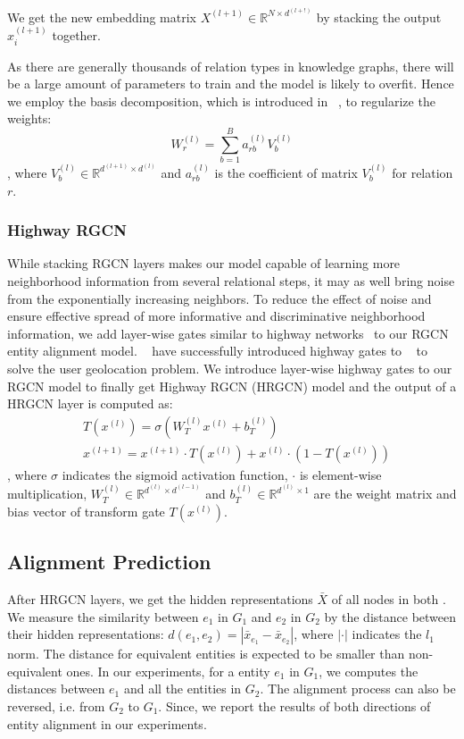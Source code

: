 	We get the new embedding matrix $X^{(l+1)} \in \mathbb{R}^{N \times d^{(l+!)}}$ by stacking the output $x_i^{(l+1)}$ together.
	
	As there are generally thousands of relation types in knowledge graphs, there will be a large amount of parameters to train and the model is likely to overfit. Hence we employ the basis decomposition, which is introduced in ~\cite{Schlichtkrull2017Modeling}, to regularize the weights:
	\begin{equation}
	W_r^{(l)}=\sum\limits_{b=1}^B a_{rb}^{(l)}V_b^{(l)}
	\end{equation}
	, where $V_b^{(l)} \in \mathbb{R}^{d^{(l+1)} \times d^{(l)}}$ and $a_{rb}^{(l)}$ is the coefficient of matrix $V_b^{(l)}$ for relation $r$.
	
	
	\subsubsection{Highway RGCN}
	\label{section:hgcn}
	While stacking RGCN layers makes our model capable of learning more neighborhood information from several relational steps, it may as well bring noise from the exponentially increasing neighbors. To reduce the effect of noise and ensure effective spread of more informative and discriminative neighborhood information, we add layer-wise gates similar to highway networks~\cite{Srivastava2015Highway} to our RGCN entity alignment model. ~\cite{Rahimi2018Semi} have successfully introduced highway gates to \GCNs~\cite{Kipf2016Semi} to solve the user geolocation problem. We introduce layer-wise highway gates to our RGCN model to finally get Highway RGCN (HRGCN) model and the output of a HRGCN layer is computed as:
	\begin{equation}
	\begin{split}
	&T(x^{(l)})=\sigma(W_T^{(l)}x^{(l)}+b_T^{(l)}) \\
	&x^{(l+1)}=x^{(l+1)} \cdot T(x^{(l)})+x^{(l)} \cdot (1-T(x^{(l)}))
	\end{split}
	\end{equation}
	, where $\sigma$ indicates the sigmoid activation function, $\cdot$ is element-wise multiplication, $W_T^{(l)} \in \mathbb{R}^{d^{(l)} \times d^{(l-1)}}$ and $b_T^{(l)} \in \mathbb{R}^{d^{(l)} \times 1}$ are the weight matrix and bias vector of transform gate $T(x^{(l)})$.
	
	\subsection{Alignment Prediction}
	After HRGCN layers, we get the hidden representations $\bar{X}$ of all nodes in both \KGs. We measure the similarity between $e_1$ in $G_1$ and $e_2$ in $G_2$ by the distance between their hidden representations: $d(e_1,e_2)=|\bar{x}_{e_1}-\bar{x}_{e_2}|$, where $|\cdot|$ indicates the $l_1$ norm. The distance for equivalent entities is expected to be smaller than non-equivalent ones. In our experiments, for a entity $e_1$ in $G_1$, we computes the distances between $e_1$ and all the entities in $G_2$. The alignment process can also be reversed, i.e. from $G_2$ to $G_1$. Since, we report the results of both directions of entity alignment in our experiments.
	
